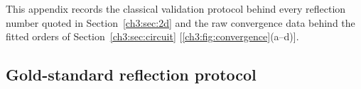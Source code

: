 
\label{ch3:appD:validation}

This appendix records the classical validation protocol behind every
reflection number quoted in Section~\ref{ch3:sec:2d} and the raw convergence
data behind the fitted orders of Section~\ref{ch3:sec:circuit}
[\ref{ch3:fig:convergence}(a--d)].

\subsection{Gold-standard reflection protocol}
\label{ch3:appD:protocol}

